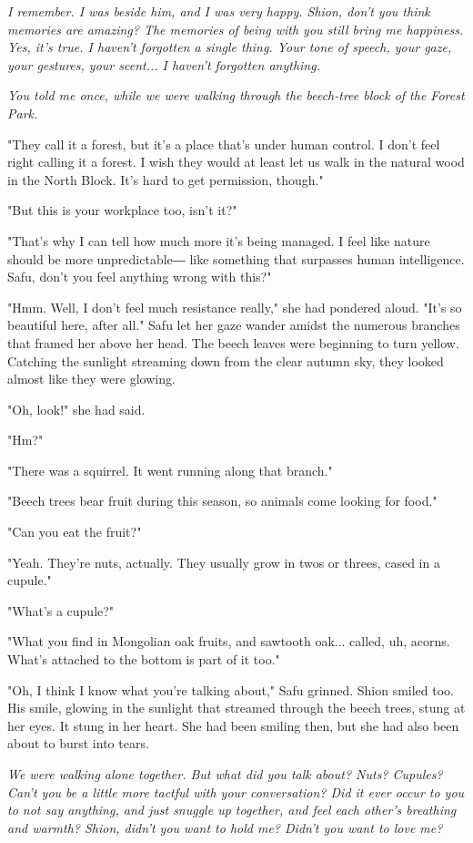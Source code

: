 \emph{I remember. I was beside him, and I was very happy. Shion, don't you
think memories are amazing? The memories of being with you still bring
me happiness. Yes, it's true. I haven't forgotten a single thing. Your
tone of speech, your gaze, your gestures, your scent... I haven't
forgotten anything.}

\emph{You told me once, while we were walking through the beech-tree block of
the Forest Park.}

"They call it a forest, but it's a place that's under human control. I
don't feel right calling it a forest. I wish they would at least let us
walk in the natural wood in the North Block. It's hard to get
permission, though."

"But this is your workplace too, isn't it?"

"That's why I can tell how much more it's being managed. I feel like
nature should be more unpredictable― like something that surpasses human
intelligence. Safu, don't you feel anything wrong with this?"

"Hmm. Well, I don't feel much resistance really," she had pondered
aloud. "It's so beautiful here, after all." Safu let her gaze wander
amidst the numerous branches that framed her above her head. The beech
leaves were beginning to turn yellow. Catching the sunlight streaming
down from the clear autumn sky, they looked almost like they were
glowing.

"Oh, look!" she had said.

"Hm?"

"There was a squirrel. It went running along that branch."

"Beech trees bear fruit during this season, so animals come looking for
food."

"Can you eat the fruit?"

"Yeah. They're nuts, actually. They usually grow in twos or threes,
cased in a cupule."

"What's a cupule?"

"What you find in Mongolian oak fruits, and sawtooth oak... called, uh,
acorns. What's attached to the bottom is part of it too."

"Oh, I think I know what you're talking about," Safu grinned. Shion
smiled too. His smile, glowing in the sunlight that streamed through the
beech trees, stung at her eyes. It stung in her heart. She had been
smiling then, but she had also been about to burst into tears.

\emph{We were walking alone together. But what did you talk about? Nuts?
Cupules? Can't you be a little more tactful with your conversation? Did
it ever occur to you to not say anything, and just snuggle up together,
and feel each other's breathing and warmth? Shion, didn't you want to
hold me? Didn't you want to love me?}


